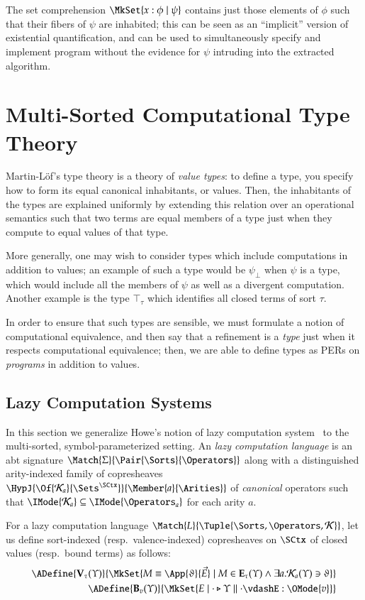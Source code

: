 \documentclass[11pt]{article}
\theoremstyle{definition}
\theoremstyle{notation}
\theoremstyle{remark}
\numberwithin{equation}{section}
\newcommand\IsSubsetEq[2]{\IMode{#1}\subseteq\IMode{#2}}
\newcommand\IsAbtUnmoded[5]{
  #1\triangleright%
  #2\parallel%
  #3\vdash%
  #4:\OMode{#5}%
}
\newcommand\TyTop[1]{\top_{#1}}
\newcommand\Exprs{\mathbf{E}}
\newcommand\Values{\mathbf{V}}
\newcommand\BExprs{\mathbf{B}}
\begin{document}
The set comprehension $\MkSet{x:\phi\mid\psi}$ contains just those elements of
$\phi$ such that their fibers of $\psi$ are inhabited; this can be seen as an
``implicit'' version of existential quantification, and can be used to
simultaneously specify and implement program without the evidence for $\psi$
intruding into the extracted algorithm.

\section{Multi-Sorted Computational Type Theory}
\label{sec:ctt}

Martin-L\"of's type theory is a theory of \emph{value types}: to define a type,
you specify how to form its equal canonical inhabitants, or values. Then, the
inhabitants of the types are explained uniformly by extending this relation
over an operational semantics such that two terms are equal members of a
type just when they compute to equal values of that type.

More generally, one may wish to consider types which include computations in
addition to values; an example of such a type would be $\psi_\bot$ when $\psi$
is a type, which would include all the members of $\psi$ as well as a divergent
computation. Another example is the type $\TyTop{\tau}$ which identifies all
closed terms of sort $\tau$.

In order to ensure that such types are sensible, we must formulate a notion of
computational equivalence, and then say that a refinement is a \emph{type} just
when it respects computational equivalence; then, we are able to define types
as PERs on \emph{programs} in addition to values.


\subsection{Lazy Computation Systems}

In this section we generalize Howe's notion of lazy computation
system~\cite{howe:1989} to the multi-sorted, symbol-parameterized setting. An
\emph{lazy computation language} is an abt signature
$\Match{\Sigma}{\Pair{\Sorts}{\Operators}}$ along with a distinguished
arity-indexed family of copresheaves
$\HypJ{\Of{\CanOperators_a}{\Sets^\SCtx}}{\Member{a}{\Arities}}$ of
\emph{canonical} operators such that
$\IsSubsetEq{\CanOperators_a}{\Operators_a}$ for each arity $a$.

For a lazy computation language
$\Match{L}{\Tuple{\Sorts,\Operators,\CanOperators}}$, let us define
sort-indexed (resp.\ valence-indexed) copresheaves on $\SCtx$ of closed values
(resp.\ bound terms) as follows:
\begin{align*}
  \ADefine{\Values_\tau(\Upsilon)}{
    \MkSet{
      M\equiv\App{\vartheta}{\vec{E}}
      \mid M\in\Exprs_\tau(\Upsilon)\land \exists a. \CanOperators_a(\Upsilon)\ni\vartheta
    }
  }\\
  \ADefine{
    \BExprs_{v}(\Upsilon)
  }{
    \MkSet{E \mid \IsAbtUnmoded{\cdot}{\Upsilon}{\cdot}{E}{v}}
  }
\end{align*}
\end{document}
